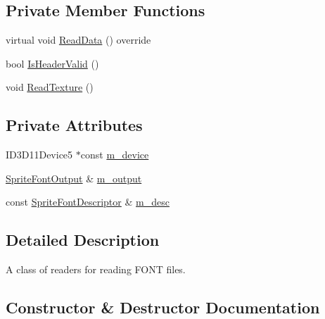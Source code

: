 \subsection*{Private Member Functions}
\begin{DoxyCompactItemize}
\item 
virtual void \hyperlink{classmage_1_1loader_1_1_sprite_font_reader_a9726c5e3ee8692a2e2f4a2c9b4b7adba}{Read\+Data} () override
\item 
bool \hyperlink{classmage_1_1loader_1_1_sprite_font_reader_a6e8d452944d4a87a8e6f89ea6d4212f0}{Is\+Header\+Valid} ()
\item 
void \hyperlink{classmage_1_1loader_1_1_sprite_font_reader_a4c95a43ec8017114981cf9817fd7e4af}{Read\+Texture} ()
\end{DoxyCompactItemize}
\subsection*{Private Attributes}
\begin{DoxyCompactItemize}
\item 
I\+D3\+D11\+Device5 $\ast$const \hyperlink{classmage_1_1loader_1_1_sprite_font_reader_ab4e714ca6e00846db7fb312d03c9ecc2}{m\+\_\+device}
\item 
\hyperlink{structmage_1_1_sprite_font_output}{Sprite\+Font\+Output} \& \hyperlink{classmage_1_1loader_1_1_sprite_font_reader_a818ecabf97163ce3a9b81f67ebfd5799}{m\+\_\+output}
\item 
const \hyperlink{classmage_1_1_sprite_font_descriptor}{Sprite\+Font\+Descriptor} \& \hyperlink{classmage_1_1loader_1_1_sprite_font_reader_adf4502be72787c09c6d4b18566fcb906}{m\+\_\+desc}
\end{DoxyCompactItemize}


\subsection{Detailed Description}
A class of readers for reading F\+O\+NT files. 

\subsection{Constructor \& Destructor Documentation}
\hypertarget{classmage_1_1loader_1_1_sprite_font_reader_aeb66e93ba6fea6590dcb4ddb290d279d}{}\label{classmage_1_1loader_1_1_sprite_font_reader_aeb66e93ba6fea6590dcb4ddb290d279d} 
